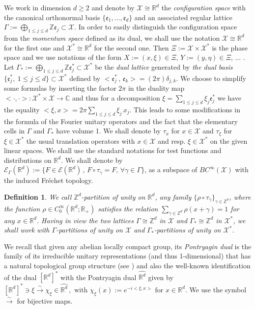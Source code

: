 \documentclass[12pt]{article}
\newtheorem{definition}[theorem]{Definition}
\theoremstyle{definition}
\def\e{\mathfrak{e}}
\def\R{\mathbb{R}}
\def\Rd{\mathbb{R}^d}
\def\Z{\mathbb{Z}}
\def\Zd{\mathbb{Z}^d}
\def\Co{{\mathbb C}}
\def\X{\mathcal X}
\numberwithin{equation}{section}
\begin{document}
We work in dimension $d\geq2$ and denote by $\X\cong\Rd$ the \textit{configuration space} with the canonical orthonormal basis $\big\{\e_1,\ldots,\e_d\big\}$ and an associated regular lattice $\Gamma:=\underset{1\leq j\leq d}{\bigoplus}\Z\e_j\subset\X$. In order to easily distinguish the configuration space from the \textit{momentum space} defined as its dual, we shall use the notation $\X\cong\R^d$ for the first one and $\X^*\cong\Rd$ for the second one. Then $\Xi:=\X\times\X^*$ is the phase space and we use notations of the form $X:=(x,\xi)\in\Xi$, $Y:=(y,\eta)\in\Xi$, ... . Let  $\Gamma_*:=\underset{1\leq j\leq d}{\bigoplus}\Z\e^*_j\subset\X^*$ be the \textit{dual lattice} generated by \textit{the dual basis} $\{\e^*_j,\ 1\leq j\leq d\}\subset\X^*$ defined by $<\e^*_j\,,\,\e_k>=(2\pi)\delta_{j,k}$. We choose to simplify some formulas by inserting the factor $2\pi$ in the duality map $<\cdot,\cdot>:\X^*\times\X\rightarrow\Co$ and thus for a decomposition $\xi=\underset{1\leq j \leq d}{\sum}\xi_j\e^*_j$ we have the equality $<\xi,x>=2\pi\underset{1\leq j \leq d}{\sum}\xi_j\,x_j$. This leads to some modifications in the formula of the Fourier unitary operators and the fact that the elementary cells in $\Gamma$ and $\Gamma_*$ have volume 1. We shall denote by $\tau_x$ for $x\in\X$ and $\tau_\xi$ for $\xi\in\X^*$ the usual translation operators with $x\in\X$ and resp. $\xi\in\X^*$ on the given linear spaces. We shall use the standard notations for test functions and distributions on $\Rd$. We shall denote by $\mathscr{E}_{\Gamma}(\Rd):=\big\{F\in\mathscr{E}(\Rd)\,,\,F\circ\tau_\gamma=F,\,\forall \gamma\in\Gamma\big\}$, as a subspace of $BC^\infty(\X)$ with the induced Fr\'{e}chet topology.

\begin{definition}\label{D-G-psrtunit}
We call  \emph{$\Zd$-partition of unity} on $\Rd$, any family $\big\{\rho\circ\tau_{\gamma}\big\}_{\gamma\in\Zd}$, where the function $\rho\in C^\infty_0(\Rd;\mathbb{R}_+)$ satisfies the relation $\underset{\gamma\in\Zd}{\sum}\rho(x+\gamma)=1$ for any $x\in\Rd$. Having in view the two lattices $\Gamma\cong\Zd$ in $\X$ and $\Gamma_*\cong\Zd$ in $\X^*$, we shall work with $\Gamma$-partitions of unity on $\X$ and $\Gamma_*$-partitions of unity on $\X^*$.
\end{definition}
We recall that given any abelian locally compact group, its \textit{Pontryagin dual} is the family of its irreducible unitary representations (and thus 1-dimensional) that has a natural topological group structure (see \cite{Fo-AHA}) and also the well-known identification of the dual $[\Rd]^*$ with the Pontryagin dual $\widehat{\Rd}$ given by
 $[\Rd]^*\ni\xi\overset{\sim}{\longrightarrow}\chi_{\xi}\in\widehat{\Rd}\,, \mbox{  with } \chi_{\xi}(x):=e^{-i<\xi,x>}  \mbox{ for } x\in\Rd$.
 We use the symbol $\overset{\sim}{\longrightarrow}$ for bijective maps.
 
\end{document}
